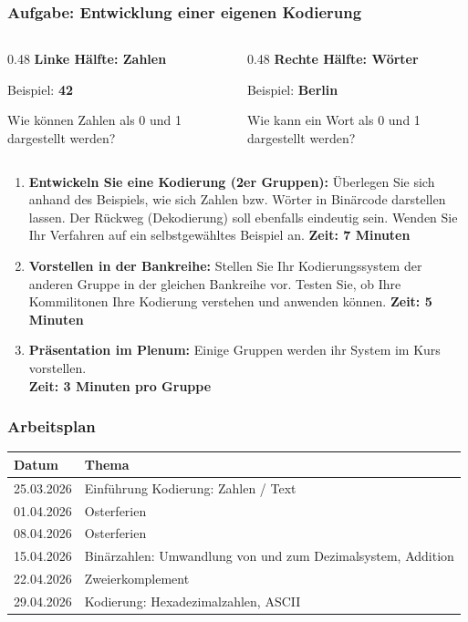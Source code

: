 \documentclass[aspectratio=169]{beamer}
\begin{document}
\begin{frame}
\frametitle{Aufgabe: Entwicklung einer eigenen Kodierung}

\begin{columns}[T]
\begin{column}{0.48\textwidth}
    \textbf{Linke Hälfte: Zahlen}
    
    Beispiel: \textbf{42}
    
    Wie können Zahlen als 0 und 1 dargestellt werden?
\end{column}

\begin{column}{0.48\textwidth}
    \textbf{Rechte Hälfte: Wörter}
    
    Beispiel: \textbf{Berlin}
    
    Wie kann ein Wort als 0 und 1 dargestellt werden?
\end{column}
\end{columns}

\vspace{0.5cm}

\begin{enumerate}
    \item \textbf{Entwickeln Sie eine Kodierung (2er Gruppen):} Überlegen Sie sich anhand des Beispiels, wie sich Zahlen bzw. Wörter in Binärcode darstellen lassen. Der Rückweg (Dekodierung) soll ebenfalls eindeutig sein. Wenden Sie Ihr Verfahren auf ein selbstgewähltes Beispiel an. \textbf{Zeit: 7 Minuten}
    
    \item \textbf{Vorstellen in der Bankreihe:} Stellen Sie Ihr Kodierungssystem der anderen Gruppe in der gleichen Bankreihe vor. Testen Sie, ob Ihre Kommilitonen Ihre Kodierung verstehen und anwenden können. \textbf{Zeit: 5 Minuten}
    
    \item \textbf{Präsentation im Plenum:} Einige Gruppen werden ihr System im Kurs vorstellen.\\ \textbf{Zeit: 3 Minuten pro Gruppe} 
\end{enumerate}

\end{frame}

\begin{frame}
\frametitle{Arbeitsplan}

\begin{table}
\centering
\begin{tabular}{l|p{9cm}}
\textbf{Datum} & \textbf{Thema} \\
\hline
25.03.2026 & Einführung Kodierung: Zahlen / Text \\
\hline
01.04.2026 & Osterferien \\
\hline
08.04.2026 & Osterferien \\
\hline
15.04.2026 & Binärzahlen: Umwandlung von und zum Dezimalsystem, Addition \\
\hline
22.04.2026 & Zweierkomplement \\
\hline
29.04.2026 & Kodierung: Hexadezimalzahlen, ASCII \\
\end{tabular}
\end{table}

\end{frame}
\end{document}
